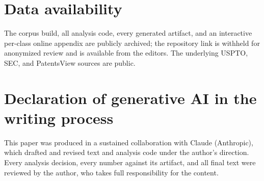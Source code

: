 \section*{Data availability}
The corpus build, all analysis code, every generated artifact, and an
interactive per-class online appendix are publicly archived; the
repository link is withheld for anonymized review and is available from
the editors. The underlying USPTO, SEC, and PatentsView sources are
public.

\section*{Declaration of generative AI in the writing process}
This paper was produced in a sustained collaboration with Claude
(Anthropic), which drafted and revised text and analysis code under the
author's direction. Every analysis decision, every number against its
artifact, and all final text were reviewed by the author, who takes full
responsibility for the content.
